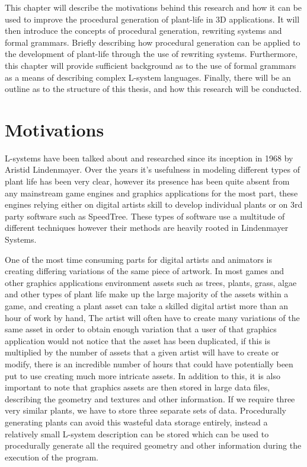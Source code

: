 This chapter will describe the motivations behind this research and how it can be used to improve the procedural generation of plant-life in 3D applications. It will then introduce the concepts of procedural generation, rewriting systems and formal grammars. Briefly describing how procedural generation can be applied to the development of plant-life through the use of rewriting systems. Furthermore, this chapter will provide sufficient background as to the use of formal grammars as a means of describing complex L-system languages. Finally, there will be an outline as to the structure of this thesis, and how this research will be conducted.


\section{Motivations}

L-systems have been talked about and researched since its inception in 1968 by Aristid Lindenmayer. Over the years it's usefulness in modeling different types of plant life has been very clear, however its presence has been quite absent from any mainstream game engines and graphics applications for the most part, these engines relying either on digital artists skill to develop individual plants or on 3rd party software such as SpeedTree. These types of software use a multitude of different techniques however their methods are heavily rooted in Lindenmayer Systems. 
 
One of the most time consuming parts for digital artists and animators is creating differing variations of the same piece of artwork. In most games and other graphics applications environment assets such as trees, plants, grass, algae and other types of plant life make up the large majority of the assets within a game, and creating a plant asset can take a skilled digital artist more than an hour of work by hand, The artist will often have to create many variations of the same asset in order to obtain enough variation that a user of that graphics application would not notice that the asset has been duplicated, if this is multiplied by the number of assets that a given artist will have to create or modify, there is an incredible number of hours that could have potentially been put to use creating much more intricate assets. In addition to this, it is also important to note that graphics assets are then stored in large data files, describing the geometry and textures and other information. If we require three very similar plants, we have to store three separate sets of data. Procedurally generating plants can avoid this wasteful data storage entirely, instead a relatively small L-system description can be stored which can be used to procedurally generate all the required geometry and other information during the execution of the program.\\

